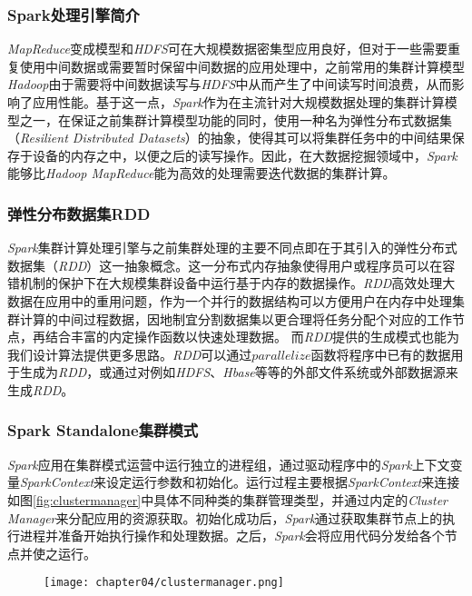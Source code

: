 \subsubsection{Spark处理引擎简介}
\label{subsubsec:spark}
\emph{MapReduce}变成模型和\emph{HDFS}可在大规模数据密集型应用良好，但对于一些需要重复使用中间数据或需要暂时保留中间数据的应用处理中，之前常用的集群计算模型\emph{Hadoop}由于需要将中间数据读写与\emph{HDFS}中从而产生了中间读写时间浪费，从而影响了应用性能。基于这一点，\emph{Spark}\cite{zaharia2010spark}作为在主流针对大规模数据处理的集群计算模型之一，在保证之前集群计算模型功能的同时，使用一种名为弹性分布式数据集（\emph{Resilient Distributed Datasets}）的抽象，使得其可以将集群任务中的中间结果保存于设备的内存之中，以便之后的读写操作。因此，在大数据挖掘领域中，\emph{Spark}能够比\emph{Hadoop MapReduce}能为高效的处理需要迭代数据的集群计算。

\subsubsection{弹性分布数据集RDD}
\label{subsubsec:rdd}
\emph{Spark}集群计算处理引擎与之前集群处理的主要不同点即在于其引入的弹性分布式数据集（\emph{RDD}）这一抽象概念。这一分布式内存抽象使得用户或程序员可以在容错机制的保护下在大规模集群设备中运行基于内存的数据操作。\emph{RDD}高效处理大数据在应用中的重用问题，作为一个并行的数据结构可以方便用户在内存中处理集群计算的中间过程数据，因地制宜分割数据集以更合理将任务分配个对应的工作节点，再结合丰富的内定操作函数以快速处理数据。
而\emph{RDD}提供的生成模式也能为我们设计算法提供更多思路。\emph{RDD}可以通过$parallelize$函数将程序中已有的数据用于生成为\emph{RDD}，或通过对例如\emph{HDFS}、\emph{Hbase}等等的外部文件系统或外部数据源来生成\emph{RDD}。

\subsubsection{Spark Standalone集群模式}
\label{subsubsec:standalone}
\emph{Spark}应用在集群模式运营中运行独立的进程组，通过驱动程序中的\emph{Spark}上下文变量\emph{SparkContext}来设定运行参数和初始化。运行过程主要根据\emph{SparkContext}来连接如图\ref{fig:clustermanager}\cite{sparkclustermanager}中具体不同种类的集群管理类型，并通过内定的\emph{Cluster Manager}来分配应用的资源获取。初始化成功后，\emph{Spark}通过获取集群节点上的执行进程并准备开始执行操作和处理数据。之后，\emph{Spark}会将应用代码分发给各个节点并使之运行。

\begin{figure}[!htp]
  \centering
  \texttt{[image: chapter04/clustermanager.png]}
\end{figure}

